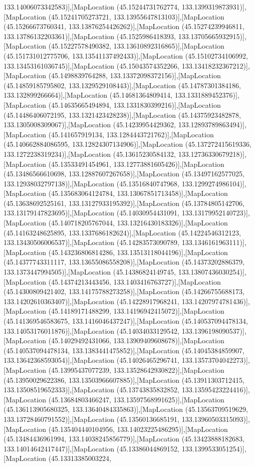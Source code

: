 133.14006073342583)],[MapLocation (45.15244731762774, 133.1399319873931)],[MapLocation (45.15241705273721, 133.13955647813103)],[MapLocation (45.15266673760341, 133.13876254426262)],[MapLocation (45.15274239946811, 133.13786132203361)],[MapLocation (45.1525986418393, 133.13705665932915)],[MapLocation (45.15227578490382, 133.13610892316865)],[MapLocation (45.151731012775706, 133.13541137492433)],[MapLocation (45.15102734106992, 133.13453161036745)],[MapLocation (45.15043574352266, 133.13418232367212)],[MapLocation (45.1498839764288, 133.13372098372156)],[MapLocation (45.14859185795802, 133.1329529108443)],[MapLocation (45.14787301384186, 133.132899266664)],[MapLocation (45.14681364809414, 133.1331889452376)],[MapLocation (45.14635665494894, 133.1331830399216)],[MapLocation (45.14486406072195, 133.1321423428238)],[MapLocation (45.14375923482878, 133.1305008309067)],[MapLocation (45.14239954429362, 133.12893789863494)],[MapLocation (45.141657919134, 133.1284443721762)],[MapLocation (45.140662884086595, 133.12824307134906)],[MapLocation (45.137272415619336, 133.1272238319234)],[MapLocation (45.13615230584132, 133.12736330679218)],[MapLocation (45.13533491454961, 133.12773881605426)],[MapLocation (45.13486566610698, 133.12887607267658)],[MapLocation (45.13497162577025, 133.12938032797138)],[MapLocation (45.13516840747968, 133.1299274986104)],[MapLocation (45.135683064124784, 133.13067851713458)],[MapLocation (45.13638692525161, 133.13127933195392)],[MapLocation (45.13784805142706, 133.13179147823695)],[MapLocation (45.14030954431091, 133.13179952140723)],[MapLocation (45.140718205767044, 133.13216430183326)],[MapLocation (45.14163248625895, 133.1337686182624)],[MapLocation (45.14224546312123, 133.13430506006537)],[MapLocation (45.14283573090789, 133.1346161963111)],[MapLocation (45.143236806814286, 133.13513118044196)],[MapLocation (45.14377743311117, 133.13655086558208)],[MapLocation (45.14373202886379, 133.1373447994505)],[MapLocation (45.14386824149745, 133.13807436030254)],[MapLocation (45.14374213443456, 133.1403416763727)],[MapLocation (45.14300809421402, 133.14175788273258)],[MapLocation (45.14266755688173, 133.14202610363407)],[MapLocation (45.14228917968241, 133.14207974781436)],[MapLocation (45.14189171488299, 133.14196942415072)],[MapLocation (45.141369546583675, 133.1416046437247)],[MapLocation (45.140537094478134, 133.14053176011876)],[MapLocation (45.14034033129542, 133.1396198090537)],[MapLocation (45.14029492431066, 133.13909409608678)],[MapLocation (45.140537094478134, 133.1383441475852)],[MapLocation (45.14045384859907, 133.13642368593054)],[MapLocation (45.14026465296741, 133.13573704042273)],[MapLocation (45.13995437077239, 133.13528642930822)],[MapLocation (45.13950029622386, 133.13503966607885)],[MapLocation (45.13911303712415, 133.13508519652333)],[MapLocation (45.13743835832852, 133.13595423224416)],[MapLocation (45.13684803466247, 133.13597568991625)],[MapLocation (45.136113905680325, 133.13640484335863)],[MapLocation (45.13563709519629, 133.13728460791552)],[MapLocation (45.13560136685191, 133.13960503315093)],[MapLocation (45.135404440104956, 133.14023225486295)],[MapLocation (45.13484436961994, 133.14038245856779)],[MapLocation (45.13423888182683, 133.14014642417447)],[MapLocation (45.13386044869152, 133.1399533051254)],[MapLocation (45.13313385003224, 